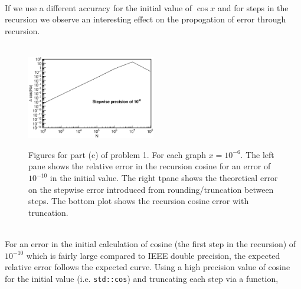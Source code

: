 \documentclass[singlepage,notitlepage,nofootinbib,11pt]{revtex4-1}
\begin{document}
\\
\indent If we use a different accuracy for the initial value of $\cos x$ and for steps in the recursion we observe an interesting effect on the propogation of error through recursion.
\begin{figure}[h]
  \centering
{}
\\
  \includegraphics[width=0.5\textwidth]{figures/1c_stepwise.eps}
  \hfill
  \caption{Figures for part (c) of problem 1. For each graph $x = 10^{-6}$. The left pane shows the relative error in the recursion cosine for an error of $10^{-10}$ in the initial value. The right tpane shows the theoretical error on the stepwise error introduced from rounding/truncation between steps. The bottom plot shows the recursion cosine error with truncation.}
\end{figure}
\\
For an error in the initial calculation of cosine (the first step in the recursion) of $10^{-10}$ which is fairly large compared to IEEE double precision, the expected relative error follows the expected curve. Using a high precision value of cosine for the initial value (i.e. \verb|std::cos|) and truncating each step via a function,
\end{document}
